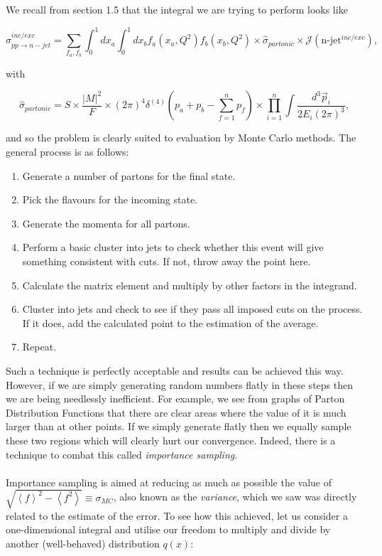 We recall from section 1.5 that the integral we are trying to perform looks like

\begin{equation}
\sigma_{pp \to n-jet}^{inc/exc} = \sum_{f_a, f_b} \int_0^1 dx_a \int_0^1 dx_b f_a(x_a, Q^2) f_b(x_b, Q^2) \times \hat{\sigma}_{partonic} \times \mathcal{J}(\text{n-jet}^{inc/exc}),
\end{equation}

with

\begin{equation}
\hat{\sigma}_{partonic} = S \times \frac{|M|^2}{F} \times (2 \pi)^4 \delta^{(4)}(p_a + p_b - \sum_{f=1}^n p_f) \times \prod_{i=1}^n \int \frac{d^3 \vec{p}_i}{2 E_i (2 \pi)^3},
\end{equation}

and so the problem is clearly suited to evaluation by Monte Carlo methods. The general process is as follows:

\begin{enumerate} 
\item{Generate a number of partons for the final state.}
\item{Pick the flavours for the incoming state.}
\item{Generate the momenta for all partons.}
\item{Perform a basic cluster into jets to check whether this event will give something consistent with cuts. If not, throw away the point here.}
\item{Calculate the matrix element and multiply by other factors in the integrand.}
\item{Cluster into jets and check to see if they pass all imposed cuts on the process. If it does, add the calculated point to the estimation of the average.}
\item{Repeat.}

\end{enumerate}

Such a technique is perfectly acceptable and results can be achieved this way. However, if we are simply generating random numbers flatly in these steps then we are being needlessly inefficient. For example, we see from graphs of Parton Distribution Functions that there are clear areas where the value of it is much larger than at other points. If we simply generate flatly then we equally sample these two regions which will clearly hurt our convergence. Indeed, there is a technique to combat this called \emph{importance sampling}. \\
\\
Importance sampling is aimed at reducing as much as possible the value of $\sqrt{\left<f \right>^2 - \left<f^2 \right>} \equiv \sigma_{MC}$, also known as the \emph{variance}, which we saw was directly related to the estimate of the error. To see how this achieved, let us consider a one-dimensional integral and utilise our freedom to multiply and divide by another (well-behaved) distribution $q(x)$:

